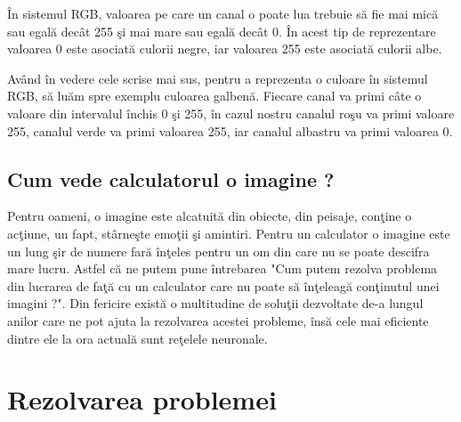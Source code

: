 \par

\^{I}n sistemul RGB, valoarea pe care un canal o poate lua trebuie s\u{a} fie mai mic\u{a} sau egal\u{a} dec\^{a}t 255 \c{s}i mai mare sau egal\u{a} dec\^{a}t 0. \^{I}n acest tip de reprezentare valoarea 0 este asociat\u{a} culorii negre, iar valoarea 255 este asociat\u{a} culorii albe. 

\par

Av\^{a}nd \^{i}n vedere cele scrise mai sus, pentru a reprezenta o culoare \^{i}n sistemul RGB, s\u{a} lu\u{a}m spre exemplu culoarea galben\u{a}. Fiecare canal va primi c\^{a}te o valoare din intervalul \^{i}nchis 0 \c{s}i 255, \^{i}n cazul nostru canalul ro\c{s}u va primi valoare 255, canalul verde va primi valoarea 255, iar canalul albastru va primi valoarea 0.

\subsection{Cum vede calculatorul o imagine ?}

Pentru oameni, o imagine este alcatuit\u{a} din obiecte, din peisaje, con\c{t}ine o ac\c{t}iune, un fapt, st\^{a}rne\c{s}te emo\c{t}ii \c{s}i amintiri. Pentru un calculator o imagine este un lung \c{s}ir de numere far\u{a} \^{i}n\c{t}eles pentru un om din care nu se poate descifra mare lucru. Astfel c\u{a} ne putem pune \^{i}ntrebarea "Cum putem rezolva problema din lucrarea de fa\c{t}\u{a} cu un calculator care nu poate s\u{a} \^{i}n\c{t}eleag\u{a} con\c{t}inutul unei imagini ?". Din fericire exist\u{a} o multitudine de solu\c{t}ii dezvoltate de-a lungul anilor care ne pot ajuta la rezolvarea acestei probleme, \^{i}ns\u{a} cele mai eficiente dintre ele la ora actual\u{a} sunt re\c{t}elele neuronale.

\section{Rezolvarea problemei}

